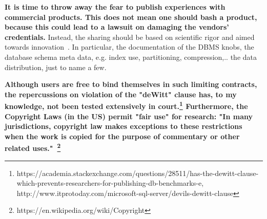 \documentclass{cidr-2019}
\begin{document}
%
%
{\bf It is time to throw away the fear to publish experiences with
commercial products.  This does not mean one should bash a product,
because this could lead to a lawsuit on damaging the vendors'
credentials.}  Instead, the sharing should be based on scientific rigor
and aimed towards innovation~\cite{DBLP:conf/sigmod/RaasveldtHGM18}.
In particular, the documentation of the DBMS knobs, the database schema meta data, e.g. index use, partitioning, compression,.. the data distribution, just to name a few.


{\bf Although users are free to bind themselves in such limiting contracts, the repercussions on violation of the "deWitt" clause has, to my knowledge, not been tested extensively in court.\footnote{https://academia.stackexchange.com/questions/28511/has-the-dewitt-clause-which-prevents-researchers-for-publishing-db-benchmarks-e, http://www.itprotoday.com/microsoft-sql-server/devils-dewitt-clause}
Furthermore, the Copyright Laws (in the US) permit "fair use" for research:  
"In many jurisdictions, copyright law makes exceptions to these restrictions when the work is copied for the purpose of commentary or other related uses."~\footnote{https://en.wikipedia.org/wiki/Copyright}}
\end{document}
